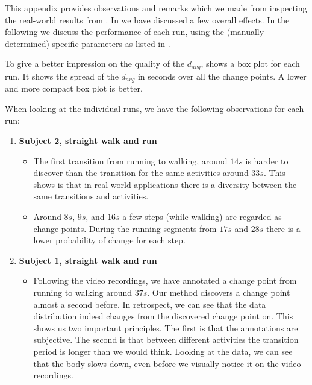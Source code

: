 This appendix provides observations and remarks which we made from inspecting the real-world results from .
In  we have discussed a few overall effects.
In the following we discuss the performance of each run, using the (manually determined) specific parameters as listed in .

To give a better impression on the quality of the $d_{avg}$,  shows a box plot for each run.
It shows the spread of the $d_{avg}$ in seconds over all the change points.
A lower and more compact box plot is better.

When looking at the individual runs, we have the following observations for each run:

\begin{enumerate}
  \item \textbf{Subject 2, straight walk and run} 
    \begin{itemize}
      \item The first transition from running to walking, around $14s$ is harder to discover than the transition for the same activities around $33s$.
      This shows is that in real-world applications there is a diversity between the same transitions and activities.
      \item Around $8s$, $9s$, and $16s$ a few steps (while walking) are regarded as change points.
      During the running segments from $17s$ and $28s$ there is a lower probability of change for each step.
    \end{itemize}
  \item \textbf{Subject 1, straight walk and run} 
    \begin{itemize}
      \item Following the video recordings, we have annotated a change point from running to walking around $37s$.
      Our method discovers a change point almost a second before.
      In retrospect, we can see that the data distribution indeed changes from the discovered change point on.
      This shows us two important principles.
      The first is that the annotations are subjective.
      The second is that between different activities the transition period is longer than we would think.
      Looking at the data, we can see that the body slows down, even before we visually notice it on the video recordings.
    \end{itemize}


\end{enumerate}
